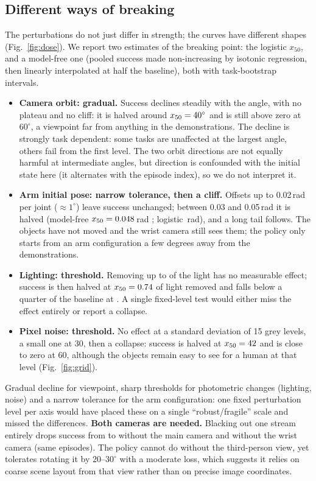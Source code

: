 \subsection{Different ways of breaking}
The perturbations do not just differ in strength; the curves have different shapes (Fig.~\ref{fig:dose}).
We report two estimates of the breaking point: the logistic $x_{50}$, and a model-free one (pooled
success made non-increasing by isotonic regression, then linearly interpolated at half the baseline),
both with task-bootstrap intervals.
\begin{itemize}
  \item \textbf{Camera orbit: gradual.} Success declines steadily with the angle, with no plateau and no
  cliff: it is halved around $x_{50}=40^\circ$ \CamXfiftyCI{} and is still above zero at
  $60^\circ$, a viewpoint far from anything in the demonstrations. The decline is strongly task
  dependent: some tasks are unaffected at the largest angle, others fail from the first level. The two
  orbit directions are not equally harmful at intermediate angles, but direction is confounded with the
  initial state here (it alternates with the episode index), so we do not interpret it.
  \item \textbf{Arm initial pose: narrow tolerance, then a cliff.} Offsets up to 0.02\,rad per joint
  ($\approx1^\circ$) leave success unchanged; between 0.03 and 0.05\,rad it is halved (model-free
  $x_{50}=0.048$\,rad \RobotXfiftyInterpCI{}; logistic \RobotXfifty{}\,rad), and a long tail
  follows. The objects have not moved and the wrist camera still sees them; the policy only starts
  from an arm configuration a few degrees away from the demonstrations.
  \item \textbf{Lighting: threshold.} Removing up to \LightCliffLow{} of the light has no measurable
  effect; success is then halved at $x_{50}=0.74$ \LightXfiftyInterpCI{} of light removed
  and falls below a quarter of the baseline at \LightCliffHigh{}. A single fixed-level test would either
  miss the effect entirely or report a collapse.
  \item \textbf{Pixel noise: threshold.} No effect at a standard deviation of 15 grey levels, a small
  one at 30, then a collapse: success is halved at $x_{50}=42$ \NoiseXfiftyInterpCI{} and is
  close to zero at 60, although the objects remain easy to see for a human at that level
  (Fig.~\ref{fig:grid}).
\end{itemize}
Gradual decline for viewpoint, sharp thresholds for photometric changes (lighting, noise) and a narrow
tolerance for the arm configuration: one fixed perturbation level per axis would have placed these on a
single ``robust/fragile'' scale and missed the differences.
\textbf{Both cameras are needed.} Blacking out one stream entirely drops success from \CamMaskBoth{} to
\CamMaskAgent{} without the main camera and \CamMaskWrist{} without the wrist camera (same episodes). The
policy cannot do without the third-person view, yet tolerates rotating it by $20$--$30^\circ$ with a
moderate loss, which suggests it relies on coarse scene layout from that view rather than on precise
image coordinates.



